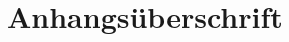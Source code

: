 \documentclass[ngerman, notitlepage,12pt,a4paper]{scrartcl}
\begin{document}

\maketitle	
\onehalfspacing

\tableofcontents    %
\clearpage
\listoffigures      %
\clearpage
{}




\clearpage
\nocite{*}          %



\clearpage
\appendix
\section{Anhangsüberschrift}
\end{document}
